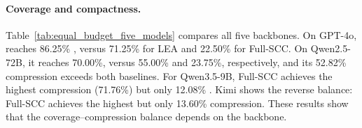 \begin{revadded}


\paragraph{Coverage and compactness.}
Table~\ref{tab:equal_budget_five_models} compares all five backbones. On GPT-4o, \samcgs{} reaches 86.25\% \rootthree{}, versus 71.25\% for LEA and 22.50\% for Full-SCC. On Qwen2.5-72B, it reaches 70.00\%, versus 55.00\% and 23.75\%, respectively, and its 52.82\% compression exceeds both baselines. For Qwen3.5-9B, Full-SCC achieves the highest compression (71.76\%) but only 12.08\% \riskall{}. Kimi shows the reverse balance: Full-SCC achieves the highest \riskall{} but only 13.60\% compression. These results show that the coverage--compression balance depends on the backbone.
\end{revadded}
